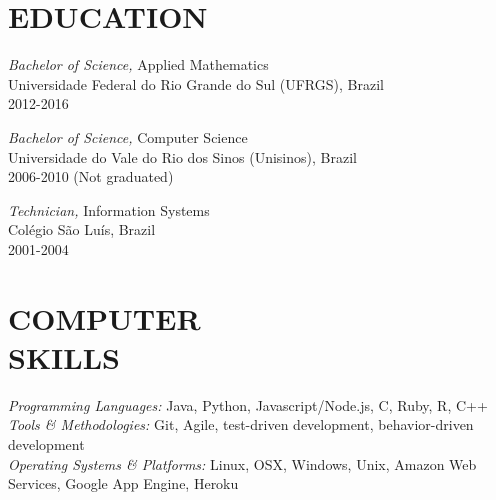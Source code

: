 \documentclass[line,margin]{res}
\begin{document}
\address{Porto Alegre, Rio Grande do Sul, Brazil}
\address{+55 51 8216 1084, fmagalhaes@gmail.com}
\address{GitHub: https://github.com/fabiogm}

\begin{resume}
 
\section{EDUCATION} {\sl Bachelor of Science,} Applied Mathematics \\
                Universidade Federal do Rio Grande do Sul (UFRGS), Brazil \\ 
                2012-2016

                   {\sl Bachelor of Science,} Computer Science \\
                Universidade do Vale do Rio dos Sinos (Unisinos), Brazil \\
                2006-2010 (Not graduated)

                   {\sl Technician,} Information Systems \\
                Colégio São Luís, Brazil \\
                2001-2004

 
\section{COMPUTER \\ SKILLS} {\sl Programming Languages:} Java, Python, Javascript/Node.js, C, Ruby, R, C++ \\
		{\sl Tools \& Methodologies:} Git, Agile, test-driven development, behavior-driven development\\
                {\sl Operating Systems \& Platforms:} Linux, OSX, Windows, Unix, Amazon Web Services, Google App Engine, Heroku
 

\end{resume}
\end{document}
